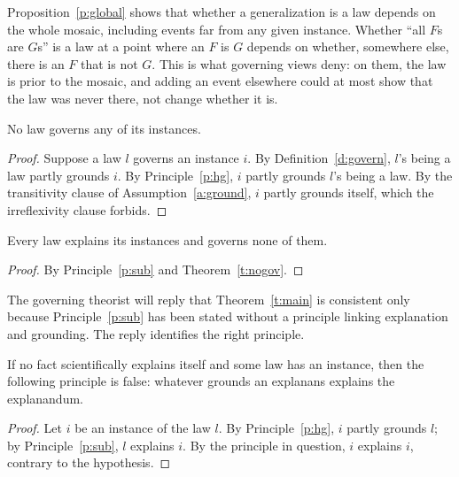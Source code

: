 \documentclass{situationist-preprint}
\begin{document}
Proposition~\ref{p:global} shows that whether a generalization is a law depends on the whole mosaic, including events far from any given instance. Whether \enquote{all $F$s are $G$s} is a law at a point where an $F$ is $G$ depends on whether, somewhere else, there is an $F$ that is not $G$. This is what governing views deny: on them, the law is prior to the mosaic, and adding an event elsewhere could at most show that the law was never there, not change whether it is.

\begin{theorem}[No governance]\label{t:nogov}
No law governs any of its instances.
\end{theorem}

\begin{proof}
Suppose a law $l$ governs an instance $i$. By Definition~\ref{d:govern}, $l$'s being a law partly grounds $i$. By Principle~\ref{p:hg}, $i$ partly grounds $l$'s being a law. By the transitivity clause of Assumption~\ref{a:ground}, $i$ partly grounds itself, which the irreflexivity clause forbids.
\end{proof}

\begin{theorem}\label{t:main}
Every law explains its instances and governs none of them.
\end{theorem}

\begin{proof}
By Principle~\ref{p:sub} and Theorem~\ref{t:nogov}.
\end{proof}

The governing theorist will reply that Theorem~\ref{t:main} is consistent only because Principle~\ref{p:sub} has been stated without a principle linking explanation and grounding. The reply identifies the right principle.

\begin{corollary}\label{c:mixed}
If no fact scientifically explains itself and some law has an instance, then the following principle is false: whatever grounds an explanans explains the explanandum.
\end{corollary}

\begin{proof}
Let $i$ be an instance of the law $l$. By Principle~\ref{p:hg}, $i$ partly grounds $l$; by Principle~\ref{p:sub}, $l$ explains $i$. By the principle in question, $i$ explains $i$, contrary to the hypothesis.
\end{proof}
\end{document}
